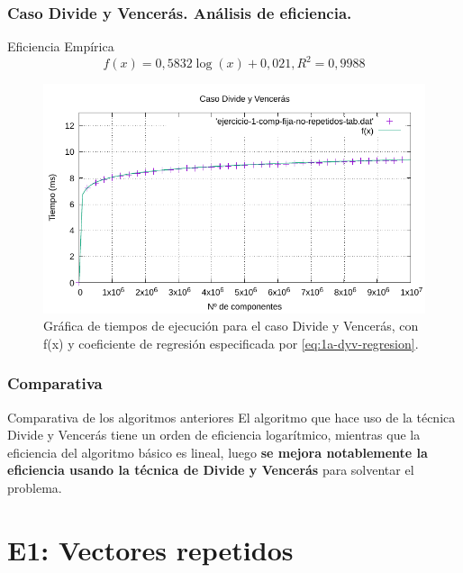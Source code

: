 \documentclass[13pt]{beamer}
\begin{document}
	\begin{frame}
		\frametitle{Caso Divide y Vencerás. Análisis de eficiencia.}
		\begin{block}{Eficiencia Empírica}
			\begin{equation}
			\boxed{f(x) = 0,5832 \log(x) + 0,021, R^2 = 0,9988}
			\label{eq:1a-dyv-regresion}
			\end{equation}
		\end{block}
		\begin{figure}
			\centering
			\includegraphics[scale=0.76]{img/e1a-dyv}
			\caption{Gráfica de tiempos de ejecución para el caso Divide y Vencerás, 
				con f(x) y coeficiente de regresión especificada por \ref{eq:1a-dyv-regresion}.}
			\label{fig:1a-dyv-graph}
		\end{figure}
	\end{frame}

	\begin{frame}
		\frametitle{Comparativa}
		\begin{block}{Comparativa de los algoritmos anteriores}
			El algoritmo que hace uso de la técnica Divide y Vencerás tiene un orden de eficiencia logarítmico, mientras que la eficiencia del algoritmo básico es lineal, luego \textbf{se mejora notablemente la eficiencia usando la técnica de Divide y Vencerás} para solventar el problema. 
		\end{block}
	\end{frame}



    \section{E1: Vectores repetidos}
\end{document}

